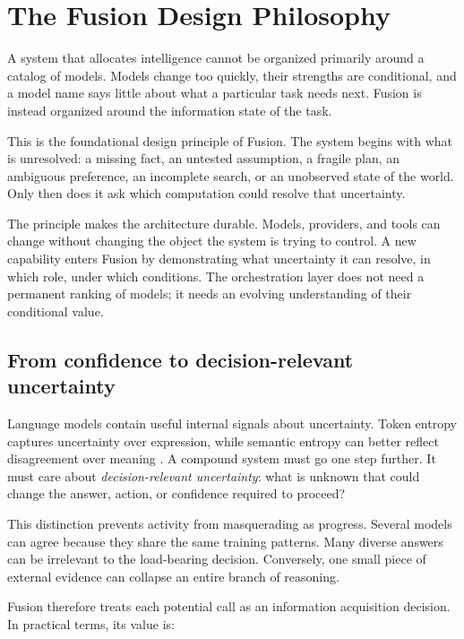 \section{The Fusion Design Philosophy}

A system that allocates intelligence cannot be organized primarily around a
catalog of models. Models change too quickly, their strengths are conditional,
and a model name says little about what a particular task needs next. Fusion is
instead organized around the information state of the task.


This is the foundational design principle of Fusion. The system begins with
what is unresolved: a missing fact, an untested assumption, a fragile plan, an
ambiguous preference, an incomplete search, or an unobserved state of the
world. Only then does it ask which computation could resolve that uncertainty.

The principle makes the architecture durable. Models, providers, and tools can
change without changing the object the system is trying to control. A new
capability enters Fusion by demonstrating what uncertainty it can resolve, in
which role, under which conditions. The orchestration layer does not need a
permanent ranking of models; it needs an evolving understanding of their
conditional value.

\subsection{From confidence to decision-relevant uncertainty}

Language models contain useful internal signals about uncertainty. Token
entropy captures uncertainty over expression, while semantic entropy can
better reflect disagreement over meaning
\citep{kuhn2023semantic,farquhar2024semantic}. A compound system must go one
step further. It must care about \emph{decision-relevant uncertainty}: what is
unknown that could change the answer, action, or confidence required to
proceed?

This distinction prevents activity from masquerading as progress. Several
models can agree because they share the same training patterns. Many diverse
answers can be irrelevant to the load-bearing decision. Conversely, one small
piece of external evidence can collapse an entire branch of reasoning.

Fusion therefore treats each potential call as an information acquisition
decision. In practical terms, its value is:

